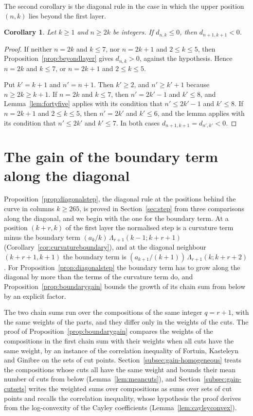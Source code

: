 \documentclass{amsart}
\newtheorem{corollary}[theorem]{Corollary}
\theoremstyle{definition}
\theoremstyle{remark}
\numberwithin{equation}{section}
\begin{document}
The second corollary is the diagonal rule in the case in which the upper
position $(n,k)$ lies beyond the first layer.

\begin{corollary}\label{cor:diagonalbeyond}
Let $k\ge1$ and $n\ge2k$ be integers. If $d_{n,k}\le0$, then
$d_{n+1,k+1}<0$.
\end{corollary}

\begin{proof}
If neither $n=2k$ and $k\le7$, nor $n=2k+1$ and $2\le k\le5$, then
Proposition~\ref{prop:beyondlayer} gives $d_{n,k}>0$, against the
hypothesis. Hence $n=2k$ and $k\le7$, or $n=2k+1$ and $2\le k\le5$.

Put $k'=k+1$ and $n'=n+1$. Then $k'\ge2$, and $n'\ge k'+1$ because
$n\ge2k\ge k+1$. If $n=2k$ and $k\le7$, then $n'=2k'-1$ and $k'\le8$, and
Lemma~\ref{lem:fortyfive} applies with its condition that $n'\le2k'-1$ and
$k'\le8$. If $n=2k+1$ and $2\le k\le5$, then $n'=2k'$ and $k'\le6$, and the
lemma applies with its condition that $n'\le2k'$ and $k'\le7$. In both
cases $d_{n+1,k+1}=d_{n',k'}<0$.
\end{proof}

\section{The gain of the boundary term along the diagonal}\label{sec:gain}
Proposition~\ref{prop:diagonalstep}, the diagonal rule at the positions
behind the curve in columns $k\ge265$, is proved in Section~\ref{sec:step}
from three comparisons along the diagonal, and we begin with the one for the
boundary term. At a position $(k+r,k)$ of the first layer the normalised
step is a curvature term minus the boundary term
$(a_k/k)\,\Lambda_{r+1}(k-1;k+r+1)$
(Corollary~\ref{cor:curvatureboundary}), and at the diagonal neighbour
$(k+r+1,k+1)$ the boundary term is
$(a_{k+1}/(k+1))\,\Lambda_{r+1}(k;k+r+2)$. For
Proposition~\ref{prop:diagonalstep} the boundary term has to grow along the
diagonal by more than the terms of the curvature term do, and
Proposition~\ref{prop:boundarygain} bounds the growth of its chain sum from
below by an explicit factor.

The two chain sums run over the compositions of the same integer $q=r+1$,
with the same weights of the parts, and they differ only in the weights of
the cuts. The proof of Proposition~\ref{prop:boundarygain} compares the
weights of the compositions in the first chain sum with their weights when
all cuts have the same weight, by an instance of the correlation inequality
of Fortuin, Kasteleyn and Ginibre \cite[Proposition~1]{fortuin1971} on the
sets of cut points. Section~\ref{subsec:gain-homogeneous} treats the
compositions whose cuts all have the same weight and bounds their mean
number of cuts from below (Lemma~\ref{lem:meancuts}), and
Section~\ref{subsec:gain-cutsets} writes the weighted sums over
compositions as sums over sets of cut points and recalls the correlation
inequality, whose hypothesis the proof derives
from the log-convexity of the Cayley coefficients
(Lemma~\ref{lem:cayleyconvex}).
\end{document}
